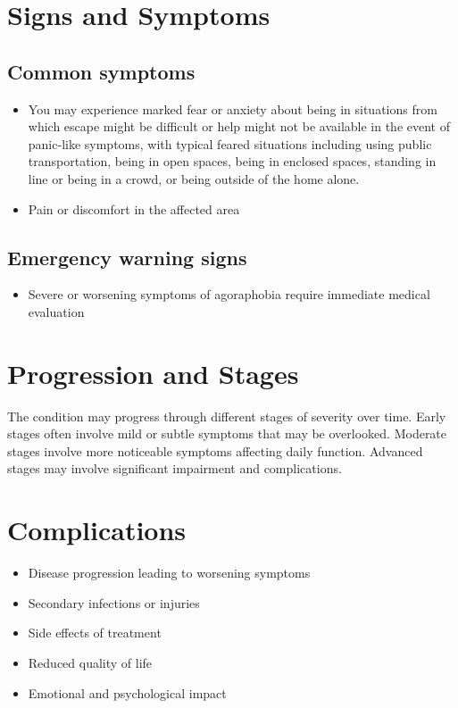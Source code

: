 \section{Signs and Symptoms}

\subsection{Common symptoms}
\begin{itemize}[noitemsep]
  \item You may experience marked fear or anxiety about being in situations from which escape might be difficult or help might not be available in the event of panic-like symptoms, with typical feared situations including using public transportation, being in open spaces, being in enclosed spaces, standing in line or being in a crowd, or being outside of the home alone.
  \item Pain or discomfort in the affected area
  \end{itemize}

\subsection{Emergency warning signs}
\begin{itemize}[noitemsep]
  \item Severe or worsening symptoms of agoraphobia require immediate medical evaluation
\end{itemize}
\section{Progression and Stages}
The condition may progress through different stages of severity over time. Early stages often involve mild or subtle symptoms that may be overlooked. Moderate stages involve more noticeable symptoms affecting daily function. Advanced stages may involve significant impairment and complications.
\section{Complications}
\begin{itemize}[noitemsep]
  \item Disease progression leading to worsening symptoms
  \item Secondary infections or injuries
  \item Side effects of treatment
  \item Reduced quality of life
  \item Emotional and psychological impact
\end{itemize}
